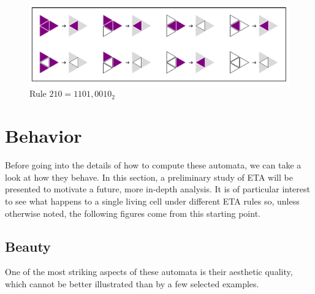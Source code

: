 \documentclass{article}
\begin{document}
\begin{figure}[H]
    \centering
    \includegraphics[width=.8\textwidth]{graphics/introduction/rule-plot-210.pdf}
    \caption{Rule $210=1101,0010_2$}
    \label{fig:rule-plot-210}
\end{figure}

\pagebreak
\section{Behavior} \label{behavior}
Before going into the details of how to compute these automata, we can take a look at how they behave. In this section, a preliminary study of ETA will be presented to motivate a future, more in-depth analysis. It is of particular interest to see what happens to a single living cell under different ETA rules so, unless otherwise noted, the following figures come from this starting point.

\subsection{Beauty} \label{beauty}
One of the most striking aspects of these automata is their aesthetic quality, which cannot be better illustrated than by a few selected examples.
\end{document}
